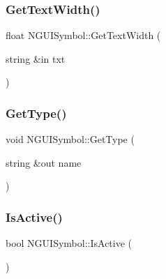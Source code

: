 \hypertarget{class_n_g_u_i_symbol_a5873ca66512357180e487d6013e4b8d0}{}\label{class_n_g_u_i_symbol_a5873ca66512357180e487d6013e4b8d0} 
\subsubsection{\texorpdfstring{Get\+Text\+Width()}{GetTextWidth()}}
{\footnotesize\ttfamily float N\+G\+U\+I\+Symbol\+::\+Get\+Text\+Width (\begin{DoxyParamCaption}\item[{string \&in}]{txt }\end{DoxyParamCaption})}

\hypertarget{class_n_g_u_i_symbol_a6239aaf60ff44cc7cf25bfbec3599be8}{}\label{class_n_g_u_i_symbol_a6239aaf60ff44cc7cf25bfbec3599be8} 
\subsubsection{\texorpdfstring{Get\+Type()}{GetType()}}
{\footnotesize\ttfamily void N\+G\+U\+I\+Symbol\+::\+Get\+Type (\begin{DoxyParamCaption}\item[{string \&out}]{name }\end{DoxyParamCaption})}

\hypertarget{class_n_g_u_i_symbol_a551d435025b3b1a767cad57dc7311cb4}{}\label{class_n_g_u_i_symbol_a551d435025b3b1a767cad57dc7311cb4} 
\subsubsection{\texorpdfstring{Is\+Active()}{IsActive()}}
{\footnotesize\ttfamily bool N\+G\+U\+I\+Symbol\+::\+Is\+Active (\begin{DoxyParamCaption}{ }\end{DoxyParamCaption})}

\hypertarget{class_n_g_u_i_symbol_a38e8fc8cb320d799e20feeebd821429b}{}\label{class_n_g_u_i_symbol_a38e8fc8cb320d799e20feeebd821429b} 
